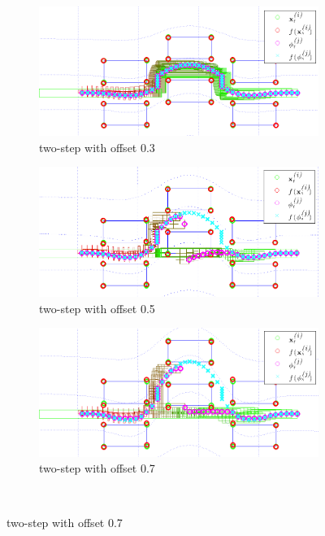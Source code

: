\begin{figure}
\centering
\begin{subfigure}[b]{.32\textwidth}
\includegraphics[width=\textwidth]{twostep_offset0-30_cropped}
\caption*{two-step with offset 0.3}
\end{subfigure}
\begin{subfigure}[b]{.32\textwidth}
\includegraphics[width=\textwidth]{twostep_offset0-50_cropped}
\caption*{two-step with offset 0.5}
\end{subfigure}
\begin{subfigure}[b]{.32\textwidth}
\includegraphics[width=\textwidth]{twostep_offset0-70_cropped}
\caption*{two-step with offset 0.7}
\end{subfigure}\\

\end{figure}
